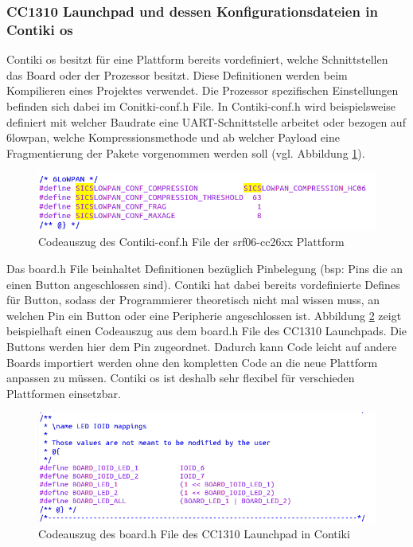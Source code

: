 	\subsubsection{CC1310 Launchpad und dessen Konfigurationsdateien in Contiki \ac{os}}
	Contiki \ac{os} besitzt für eine Plattform bereits vordefiniert, welche Schnittstellen das Board oder der Prozessor besitzt. Diese Definitionen werden beim Kompilieren eines Projektes verwendet. Die Prozessor spezifischen Einstellungen befinden sich dabei im Conitki-conf.h File. In Contiki-conf.h wird beispielsweise definiert mit welcher Baudrate eine UART-Schnittstelle arbeitet oder bezogen auf \ac{6lowpan}, welche Kompressionsmethode und ab welcher Payload eine Fragmentierung der Pakete vorgenommen werden soll (vgl. Abbildung \ref{Contiki-conf}).\\
	\begin{figure}
		\centering
		\includegraphics[scale=0.5]{Grafiken-Julian/Contiki_conf.png}
		\caption{Codeauszug des Contiki-conf.h File der srf06-cc26xx Plattform}
		\label{Contiki-conf}
	\end{figure}
	Das board.h File beinhaltet Definitionen bezüglich Pinbelegung (bsp: Pins die an einen Button angeschlossen sind). Contiki hat dabei bereits vordefinierte Defines für Button, sodass der Programmierer theoretisch nicht mal wissen muss, an welchen Pin ein Button oder eine Peripherie angeschlossen ist. Abbildung \ref{Boardfiles} zeigt beispielhaft einen Codeauszug aus dem board.h File des CC1310 Launchpads. Die Buttons werden hier dem Pin zugeordnet. Dadurch kann Code leicht auf andere Boards importiert werden ohne den kompletten Code an die neue Plattform anpassen zu müssen. Contiki \ac{os} ist deshalb sehr flexibel für verschieden Plattformen einsetzbar.\\
	\begin{figure}
		\centering
		\includegraphics[scale=0.5]{Grafiken-Julian/Boardfiles.png}
		\caption{Codeauszug des board.h File des CC1310 Launchpad in Contiki}
		\label{Boardfiles}
	\end{figure}
